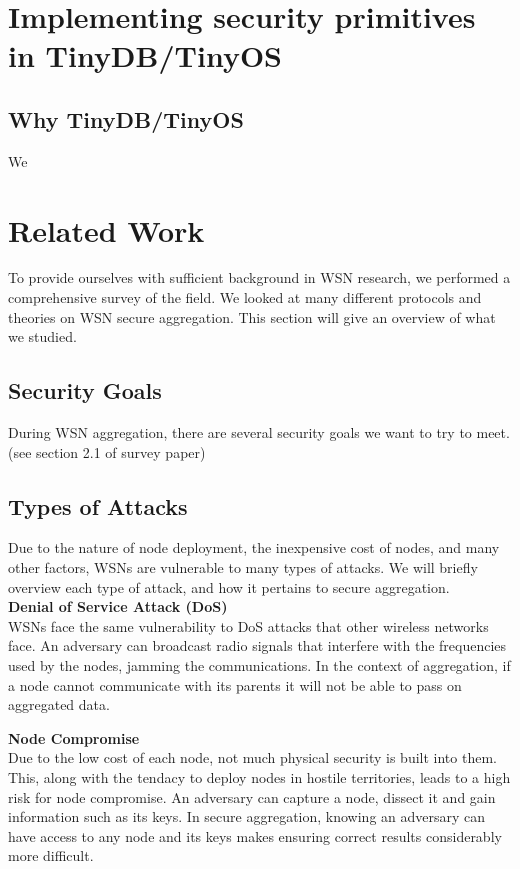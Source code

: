 \documentclass[a4paper]{article}
\begin{document}
\section{Implementing security primitives in TinyDB/TinyOS}
\label{sec:implement}

\subsection{Why TinyDB/TinyOS}

We
\section{Related Work}
\label{sec:relatedwork}

To provide ourselves with sufficient background in WSN research, we performed
a comprehensive survey of the field. We looked at many different protocols and
theories on WSN secure aggregation. This section will give an overview of what
we studied.

\subsection{Security Goals}

During WSN aggregation, there are several security goals we want to try to
meet. (see section 2.1 of survey paper)

\subsection{Types of Attacks}

Due to the nature of node deployment, the inexpensive cost of nodes, and many
other factors, WSNs are vulnerable to many types of attacks. We will briefly
overview each type of attack, and how it pertains to secure aggregation.\\

{\bf Denial of Service Attack (DoS)} \\
WSNs face the same vulnerability to DoS attacks that other wireless
networks face. An adversary can broadcast radio signals that interfere with
the frequencies used by the nodes, jamming the communications. In the context
of aggregation, if a node cannot communicate with its parents it will not be
able to pass on aggregated data.

{\bf Node Compromise} \\
Due to the low cost of each node, not much physical security is built into
them. This, along with the tendacy to deploy nodes in hostile territories,
leads to a high risk for node compromise. An adversary can capture a node,
dissect it and gain information such as its keys. In secure aggregation,
knowing an adversary can have access to any node and its keys makes ensuring
correct results considerably more difficult.
\end{document}
